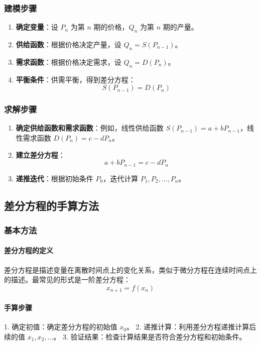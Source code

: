 \documentclass[UTF8]{ctexart}
\begin{document}
\subsubsection {建模步骤}
\begin{enumerate}
    \item \textbf{确定变量}：设 \( P_n \) 为第 \( n \) 期的价格，\( Q_n \) 为第 \( n \) 期的产量。
    \item \textbf{供给函数}：根据价格决定产量，设 \( Q_n = S(P_{n-1}) \)。
    \item \textbf{需求函数}：根据价格决定需求，设 \( Q_n = D(P_n) \)。
    \item \textbf{平衡条件}：供需平衡，得到差分方程：
    \[
    S(P_{n-1}) = D(P_n)
    \]
\end{enumerate}

\subsubsection {求解步骤}
\begin{enumerate}
    \item \textbf{确定供给函数和需求函数}：例如，线性供给函数 \( S(P_{n-1}) = a + b P_{n-1} \)，线性需求函数 \( D(P_n) = c - d P_n \)。
    \item \textbf{建立差分方程}：
    \[
    a + b P_{n-1} = c - d P_n
    \]
    \item \textbf{递推迭代}：根据初始条件 \( P_0 \)，迭代计算 \( P_1, P_2, \ldots, P_n \)。
\end{enumerate}

\subsection{差分方程的手算方法}
\subsubsection{基本方法}
\paragraph{差分方程的定义}
差分方程是描述变量在离散时间点上的变化关系，类似于微分方程在连续时间点上的描述。最常见的形式是一阶差分方程：
\[
x_{n+1} = f(x_n)
\]

\paragraph{手算步骤}
1. 确定初值：确定差分方程的初始值 \(x_0\)。
2. 递推计算：利用差分方程递推计算后续的值 \(x_1, x_2, \ldots\)。
3. 验证结果：检查计算结果是否符合差分方程和初始条件。
\end{document}
